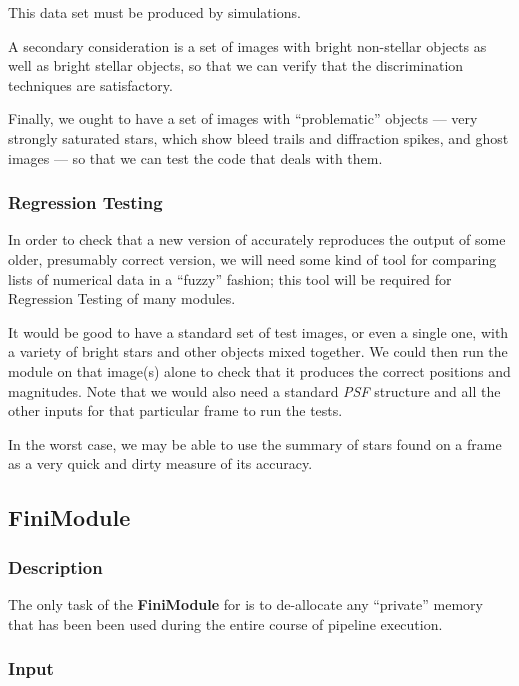 This data set must be produced by simulations.

A secondary consideration is a set of images with bright non-stellar
objects as well as bright stellar objects, so that we can verify that
the discrimination techniques are satisfactory.  

Finally, we ought to have a set of images with ``problematic'' 
objects --- very strongly saturated stars, which show bleed trails
and diffraction spikes, and ghost images --- so that we can test 
the code that deals with them.  

\subsubsection {Regression Testing}

In order to check that a new version of \fbs accurately reproduces
the output of some older, presumably correct version, 
we will need some kind of tool for comparing lists of numerical
data in a ``fuzzy'' fashion; this tool will be required for
Regression Testing of many modules.  

It would be good to have a standard set of test
images, or even a single one, with a variety of bright stars
and other objects mixed together.  We could then run the
module on that image(s) alone to check that it produces the
correct positions and magnitudes.  Note that we would also 
need a standard {\it PSF} structure and all the other inputs
for that particular frame to run the tests.

In the worst case, we may be able to use the summary of stars
found on a frame as a very quick and dirty measure of its
accuracy.

\subsection {FiniModule}

\subsubsection {Description}

The only task of the {\bf FiniModule} for \fbs is to de-allocate
any ``private'' memory that has been been used during the entire
course of pipeline execution.

\subsubsection {Input}

